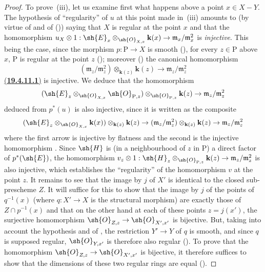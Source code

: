 \begin{proof}
To prove~(iii), let us examine first what happens above a point $x\in X-Y$.
The hypothesis of ``regularity'' of $u$ at this point made in~(iii) amounts to (by virtue of  and of ()) saying that $X$ is regular at the point $x$ and that the homomorphism $u_X\otimes 1:\sh{E}_x\otimes_{\sh{O}_{X,x}}\mathbf{k}(x)\to\mathfrak{m}_x/\mathfrak{m}_x^2$ is \emph{injective}.
This being the case, since the morphism $p:\mathrm{P}\to X$ is smooth (), for every $z\in\mathrm{P}$ above $x$, $\mathrm{P}$ is regular at the point $z$ (); moreover () the canonical homomorphism
\[
  (\mathfrak{m}_z/\mathfrak{m}_z^2)\otimes_{\mathbf{k}(z)}\mathbf{k}(z)\to\mathfrak{m}_z/\mathfrak{m}_z^2
\]
\hyperref[IV.19.4.11.1]{(\textbf{19.4.11.1})}
\label{IV.19.4.11.1}
is injective.
We deduce that the homomorphism
\[
  (\sh{E}_z\otimes_{\sh{O}_{X,x}}\sh{O}_{\mathrm{P},z})\otimes_{\sh{O}_{\mathrm{P},z}}\mathbf{k}(z)\to\mathfrak{m}_z/\mathfrak{m}_z^2
\]
deduced from $p^*(u)$ is also injective, since it is written as the composite
\[
  (\sh{E}_z\otimes_{\sh{O}_{X,x}}\mathbf{k}(x))\otimes_{\mathbf{k}(z)}\mathbf{k}(z)\to(\mathfrak{m}_z/\mathfrak{m}_z^2)\otimes_{\mathbf{k}(z)}\mathbf{k}(z)\to\mathfrak{m}_z/\mathfrak{m}_z^2
\]
where the first arrow is injective by flatness and the second is the injective homomorphism .
Since $\sh{H}$ is (in a neighbourhood of $z$ in $\mathrm{P}$) a direct factor of $p^*(\sh{E})$, the homomorphism $v_z\otimes 1:\sh{H}_z\otimes_{\sh{O}_{\mathrm{P},z}}\mathbf{k}(z)\to\mathfrak{m}_z/\mathfrak{m}_z^2$ is also injective, which establishes the ``regularity'' of the homomorphism $v$ at the point $z$.
It remains to see that the image by $j$ of $X'$ is identical to the closed sub-prescheme $Z$.
It will suffice for this to show that the image by $j$ of the points of $q^{-1}(x)$ (where $q:X'\to X$ is the structural morphism) are exactly those of $Z\cap p^{-1}(x)$ and that on the other hand at each of these points $z=j(x')$, the surjective homomorphism $\sh{O}_{Z,z}\to\sh{O}_{X',x'}$ is bijective.
But, taking into account the hypothesis and of , the restriction $Y'\to Y$ of $q$ is smooth, and since $q$ is supposed regular, $\sh{O}_{Y,x'}$ is therefore also regular ().
To prove that the homomorphism $\sh{O}_{Z,z}\to\sh{O}_{X',x'}$ is bijective, it therefore suffices to show that the dimensions
of these two regular rings are equal ().

\end{proof}
